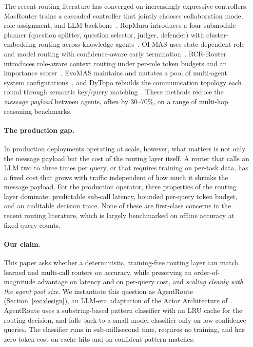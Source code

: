 \documentclass[11pt]{article}
\begin{document}
The recent routing literature has converged on increasingly expressive
controllers. MasRouter trains a cascaded controller that jointly chooses
collaboration mode, role assignment, and LLM
backbone~\citep{yue2025masrouter}. RopMura introduces a four-submodule planner
(question splitter, question selector, judger, defender) with
cluster-embedding routing across knowledge agents~\citep{wang2025ropmura}.
OI-MAS uses state-dependent role and model routing with confidence-aware
early termination~\citep{wang2026oimas}. RCR-Router introduces role-aware
context routing under per-role token budgets and an importance
scorer~\citep{liu2025rcrrouter}. EvoMAS maintains and mutates a pool of
multi-agent system configurations~\citep{evomas2026}, and DyTopo rebuilds the
communication topology each round through semantic key/query
matching~\citep{lu2026dytopo}. These methods reduce the \emph{message payload}
between agents, often by 30--70\%, on a range of multi-hop reasoning
benchmarks.

\paragraph{The production gap.}
In production deployments operating at scale, however, what matters is not
only the message payload but the cost of the routing layer itself. A router
that calls an LLM two to three times per query, or that requires
training on per-task data, has a fixed cost that grows with traffic
independent of how much it shrinks the message payload. For the production
operator, three properties of the routing layer dominate: predictable
sub-call latency, bounded per-query token budget, and an auditable decision
trace. None of these are first-class concerns in the recent routing
literature, which is largely benchmarked on offline accuracy at fixed
query counts.

\paragraph{Our claim.}
This paper asks whether a deterministic, training-free routing layer can
match learned and multi-call routers on accuracy, while preserving an
order-of-magnitude advantage on latency and on per-query cost, and
\emph{scaling cleanly with the agent pool size}. We instantiate this
question as AgentRoute (Section~\ref{sec:design}), an LLM-era adaptation of
the Actor Architecture of~\citet{jang2005efficient}. AgentRoute uses a
substring-based pattern classifier with an LRU cache for the routing
decision, and falls back to a small-model classifier only on low-confidence
queries. The classifier runs in sub-millisecond time, requires no training,
and has zero token cost on cache hits and on confident pattern matches.
\end{document}
